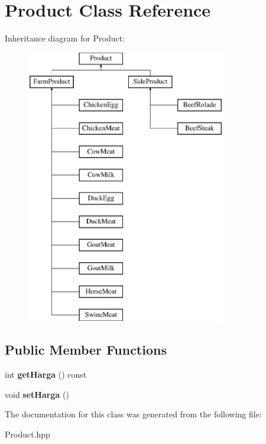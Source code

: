\hypertarget{class_product}{}\section{Product Class Reference}
\label{class_product}
Inheritance diagram for Product\+:\begin{figure}[H]
\begin{center}
\leavevmode
\includegraphics[height=12.000000cm]{class_product}
\end{center}
\end{figure}
\subsection*{Public Member Functions}
\begin{DoxyCompactItemize}
\item 
\mbox{\label{class_product_aaaa6866dd9d4e2c6d6f21cffcdd549c3}} 
int {\bfseries get\+Harga} () const
\item 
\mbox{\label{class_product_ac54d1c6a7c6c54f70d31c6457df88fec}} 
void {\bfseries set\+Harga} ()
\end{DoxyCompactItemize}


The documentation for this class was generated from the following file\+:\begin{DoxyCompactItemize}
\item 
Product.\+hpp\end{DoxyCompactItemize}
